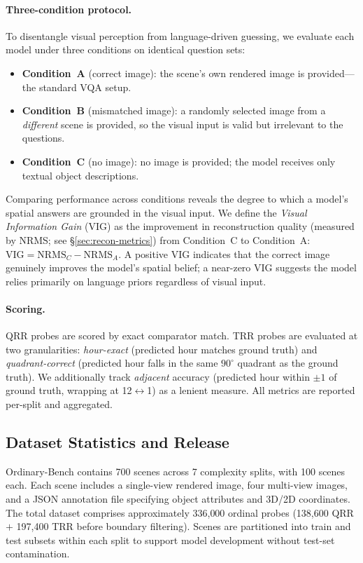\paragraph{Three-condition protocol.}
To disentangle visual perception from language-driven guessing, we evaluate each model under three conditions on identical question sets:
\begin{itemize}[nosep]
  \item \textbf{Condition~A} (correct image): the scene's own rendered image is provided---the standard VQA setup.
  \item \textbf{Condition~B} (mismatched image): a randomly selected image from a \emph{different} scene is provided, so the visual input is valid but irrelevant to the questions.
  \item \textbf{Condition~C} (no image): no image is provided; the model receives only textual object descriptions.
\end{itemize}
Comparing performance across conditions reveals the degree to which a model's spatial answers are grounded in the visual input. We define the \emph{Visual Information Gain} (VIG) as the improvement in reconstruction quality (measured by NRMS; see \S\ref{sec:recon-metrics}) from Condition~C to Condition~A: $\mathrm{VIG} = \mathrm{NRMS}_C - \mathrm{NRMS}_A$. A positive VIG indicates that the correct image genuinely improves the model's spatial belief; a near-zero VIG suggests the model relies primarily on language priors regardless of visual input.

\paragraph{Scoring.}
QRR probes are scored by exact comparator match. TRR probes are evaluated at two granularities: \emph{hour-exact} (predicted hour matches ground truth) and \emph{quadrant-correct} (predicted hour falls in the same $90^\circ$ quadrant as the ground truth). We additionally track \emph{adjacent} accuracy (predicted hour within $\pm 1$ of ground truth, wrapping at 12$\leftrightarrow$1) as a lenient measure. All metrics are reported per-split and aggregated.

\subsection{Dataset Statistics and Release}
\label{sec:dataset-stats}

Ordinary-Bench contains 700 scenes across 7 complexity splits, with 100 scenes each. Each scene includes a single-view rendered image, four multi-view images, and a JSON annotation file specifying object attributes and 3D/2D coordinates. The total dataset comprises approximately 336{,}000 ordinal probes (138{,}600 QRR $+$ 197{,}400 TRR before boundary filtering). Scenes are partitioned into train and test subsets within each split to support model development without test-set contamination.

